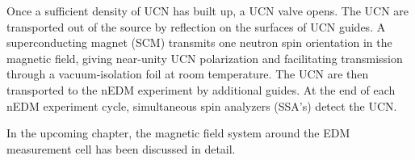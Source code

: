 Once a sufficient density of UCN has built up, a UCN valve opens. The UCN are transported out of the source by reflection on the surfaces of UCN guides. A superconducting magnet (SCM) transmits one neutron spin orientation in the magnetic field, giving near-unity UCN polarization and facilitating transmission through a vacuum-isolation foil at room temperature. The UCN are then transported to the nEDM experiment by additional guides. At the end of each nEDM experiment cycle, simultaneous spin analyzers (SSA's) detect the UCN.


In the upcoming chapter, the magnetic field system around the EDM measurement cell has been discussed in detail.









